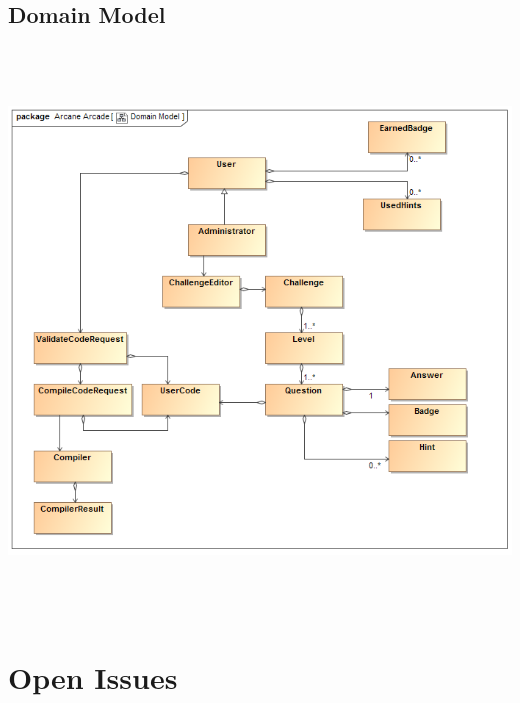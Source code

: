 \documentclass[english]{article}
\begin{document}
		 
		 \subsection{Domain Model}
		 \includegraphics[width=15cm,height=15cm,keepaspectratio]{domainModel.png}
			
	\fi
		

	\newpage
	\section{Open Issues}		


		
\end{document}
